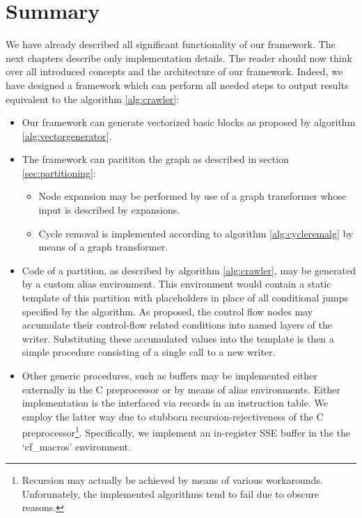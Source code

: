 \section{Summary}

We have already described all significant functionality of our framework. The next chapters describe only implementation details. The reader should now think over all introduced concepts and the architecture of our framework. Indeed, we have designed a framework which can perform all needed steps to output results equivalent to the algorithm \ref{alg:crawler}:
\begin{itemize}
  \item Our framework can generate vectorized basic blocks as proposed by algorithm \ref{alg:vectorgenerator}.
  \item The framework can parititon the graph as described in section \ref{sec:partitioning}:
  \begin{itemize}
    \item Node expansion may be performed by use of a graph transformer whose input is described by expansions.
    \item Cycle removal is implemented according to algorithm \ref{alg:cycleremalg} by means of a graph transformer.
  \end{itemize}
  \item Code of a partition, as described by algorithm \ref{alg:crawler}, may be generated by a custom alias environment. This environment would contain a static template of this partition with placeholders in place of all conditional jumps specified by the algorithm. As proposed, the control flow nodes may accumulate their control-flow related conditions into named layers of the writer. Substituting these accumulated values into the template is then a simple procedure consisting of a single call to a new writer.
  \item Other generic procedures, such as buffers may be implemented either externally in the C preprocessor or by means of alias environments. Either implementation is the interfaced via records in an instruction table. We employ the latter way due to stubborn recursion-rejectiveness of the C preprocessor\footnote{Recursion may actually be achieved by means of various workarounds. Unforunately, the implemented algorithms tend to fail due to obscure reasons.}. Specifically, we implement an in-register SSE buffer in the the `cf\_macros' environment.
\end{itemize}
